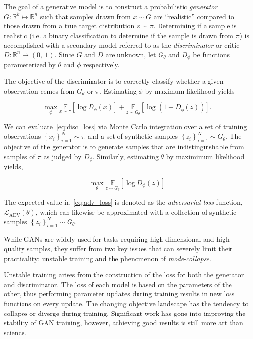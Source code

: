 The goal of a generative model is to construct a probabilistic \textit{generator} $G: \mathbb{R}^k \mapsto \mathbb{R}^n$
such that samples drawn from $x \sim G$ are ``realistic'' compared to those drawn from a true target distribution
$x \sim \pi$.
Determining if a sample is realistic  (i.e. a binary classification to determine if the sample is drawn from $\pi$) is
accomplished with a secondary model referred to as the \textit{discriminator} or critic $D: \mathbb{R}^n \mapsto (0, \; 1)$.
Since $G$ and $D$ are unknown, let $G_\theta$ and $D_\phi$ be functions parameterized by $\theta$ and $\phi$ respectively.

The objective of the discriminator is to correctly classify whether a given observation comes from $G_\theta$ or $\pi$.
Estimating $\phi$ by maximum likelihood yields

\begin{equation}
    \max_{\phi} \underset{x \sim \pi}{\mathbb{E}}\left[ \log D_\phi(x) \right] + \underset{z \sim G_\theta}{\mathbb{E}}\left[ \log \left( 1 - D_\phi(z)\right) \right].
    \label{eq:disc_loss}
\end{equation}

We can evaluate~\eqref{eq:disc_loss} via Monte Carlo integration over a set of training observations
$\left\{ x_i \right\}_{i=1}^N \sim \pi$ and a set of synthetic samples $\left\{ z_i \right\}_{i=1}^N \sim G_\theta$.
The objective of the generator is to generate samples that are indistinguishable from samples of $\pi$ as judged by $D_\phi$.
Similarly, estimating $\theta$ by maximimum likelihood yields,

\begin{equation}
    \max_{\theta} \underset{z \sim G_\theta}{\mathbb{E}}\left[ \log D_\phi(z) \right]
    \label{eq:adv_loss}
\end{equation}

The expected value in~\eqref{eq:adv_loss} is denoted as the \textit{adversarial loss} function,
$\mathcal{L}_{\text{ADV}}(\theta)$, which can likewise be approximated with a collection of synthetic samples
$\left\{ z_i \right\}_{i=1}^N \sim G_\theta$.

While GANs are widely used for tasks requiring high dimensional and high quality samples, they suffer from two key
issues that can severely limit their practicality: unstable training and the phenomenon of \textit{mode-collapse}.

Unstable training arises from the construction of the loss for both the generator and discriminator.
The loss of each model is based on the parameters of the other, thus performing parameter updates during training
results in new loss functions on every update.
The changing objective landscape has the tendency to collapse or diverge during training.
Significant work has gone into improving the stability of GAN training, however, achieving good results is still more
art than science.

